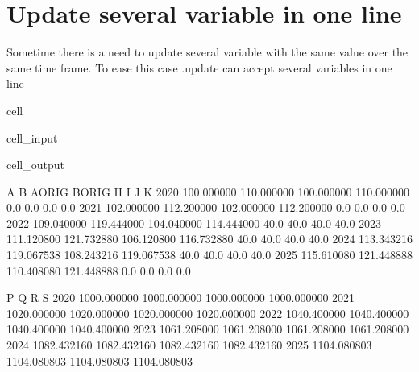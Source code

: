 \documentclass[letterpaper,10pt,english]{jupyterBook}
\begin{document}
\section{Update several variable in one line}
\label{\detokenize{content/04_PythonEssentials/UpdateCommand:update-several-variable-in-one-line}}
\sphinxAtStartPar
Sometime there is a need to update several variable with the same value over the same time frame. To ease this case .update can accept several variables in one line

\begin{sphinxuseclass}{cell}\begin{sphinxVerbatimInput}

\begin{sphinxuseclass}{cell_input}
\begin{sphinxVerbatim}[commandchars=\\\{\}]
\end{sphinxVerbatim}

\end{sphinxuseclass}\end{sphinxVerbatimInput}
\begin{sphinxVerbatimOutput}

\begin{sphinxuseclass}{cell_output}
\begin{sphinxVerbatim}[commandchars=\\\{\}]
               A           B      A\PYGZus{}ORIG      B\PYGZus{}ORIG     H     I     J     K  \PYGZbs{}
2020  100.000000  110.000000  100.000000  110.000000   0.0   0.0   0.0   0.0   
2021  102.000000  112.200000  102.000000  112.200000   0.0   0.0   0.0   0.0   
2022  109.040000  119.444000  104.040000  114.444000  40.0  40.0  40.0  40.0   
2023  111.120800  121.732880  106.120800  116.732880  40.0  40.0  40.0  40.0   
2024  113.343216  119.067538  108.243216  119.067538  40.0  40.0  40.0  40.0   
2025  115.610080  121.448888  110.408080  121.448888   0.0   0.0   0.0   0.0   

                P            Q            R            S  
2020  1000.000000  1000.000000  1000.000000  1000.000000  
2021  1020.000000  1020.000000  1020.000000  1020.000000  
2022  1040.400000  1040.400000  1040.400000  1040.400000  
2023  1061.208000  1061.208000  1061.208000  1061.208000  
2024  1082.432160  1082.432160  1082.432160  1082.432160  
2025  1104.080803  1104.080803  1104.080803  1104.080803  
\end{sphinxVerbatim}

\end{sphinxuseclass}\end{sphinxVerbatimOutput}

\end{sphinxuseclass}
\end{document}

